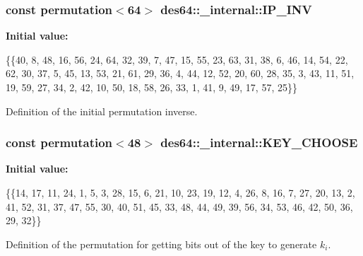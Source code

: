 \subsubsection[{\texorpdfstring{I\+P\+\_\+\+I\+NV}{IP_INV}}]{\setlength{\rightskip}{0pt plus 5cm}const {\bf permutation}$<$64$>$ des64\+::\+\_\+internal\+::\+I\+P\+\_\+\+I\+NV}\hypertarget{namespacedes64_1_1__internal_ad0ec70e35aa867cd093ca09bedda1a9c}{}\label{namespacedes64_1_1__internal_ad0ec70e35aa867cd093ca09bedda1a9c}
{\bfseries Initial value\+:}
\begin{DoxyCode}
\{\{40, 8, 48, 16, 56, 24, 64, 32, 39, 7, 47, 15, 55, 23, 63, 31,
        38, 6, 46, 14, 54, 22, 62, 30, 37, 5, 45, 13, 53, 21, 61, 29, 
        36, 4, 44, 12, 52, 20, 60, 28, 35, 3, 43, 11, 51, 19, 59, 27, 
        34, 2, 42, 10, 50, 18, 58, 26, 33, 1, 41, 9, 49, 17, 57, 25\}\}
\end{DoxyCode}


Definition of the initial permutation inverse. 

\subsubsection[{\texorpdfstring{K\+E\+Y\+\_\+\+C\+H\+O\+O\+SE}{KEY_CHOOSE}}]{\setlength{\rightskip}{0pt plus 5cm}const {\bf permutation}$<$48$>$ des64\+::\+\_\+internal\+::\+K\+E\+Y\+\_\+\+C\+H\+O\+O\+SE}\hypertarget{namespacedes64_1_1__internal_aae8bb2ebf658b6bfb76e64bbb3d9bf3b}{}\label{namespacedes64_1_1__internal_aae8bb2ebf658b6bfb76e64bbb3d9bf3b}
{\bfseries Initial value\+:}
\begin{DoxyCode}
\{\{14, 17, 11, 24, 1, 5, 3, 28, 15, 6, 21, 10, 23, 19, 12, 4, 26, 8, 16, 7,
        27, 20, 13, 2, 41, 52, 31, 37, 47, 55, 30, 40, 51, 45, 33, 48, 44, 49, 39, 
        56, 34, 53, 46, 42, 50, 36, 29, 32\}\}
\end{DoxyCode}


Definition of the permutation for getting bits out of the key to generate $ k_i $. 

